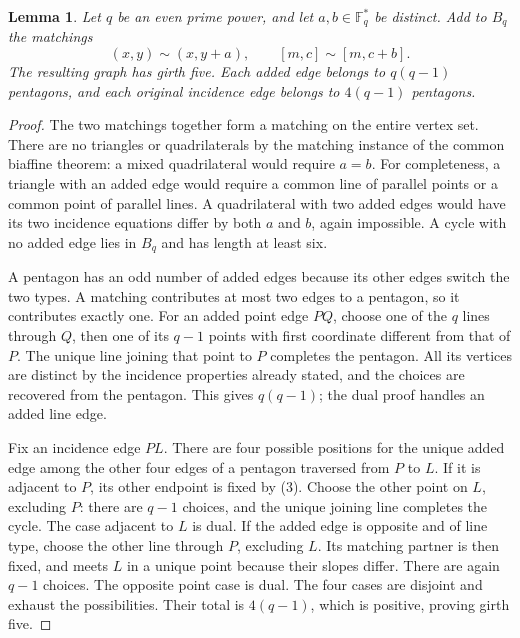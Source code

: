 \documentclass[11pt,a4paper]{article}
\newtheorem{lemma}[theorem]{Lemma}
\newcommand{\F}{\mathbb F}
\begin{document}
\begin{lemma}\label{matchingcount}
Let $q$ be an even prime power, and let $a,b\in\F_q^*$ be distinct.
Add to $B_q$ the matchings
\[
 (x,y)\sim(x,y+a),\qquad [m,c]\sim[m,c+b].
 \tag{3}
\]
The resulting graph has girth five. Each added edge belongs to
$q(q-1)$ pentagons, and each original incidence edge belongs to
$4(q-1)$ pentagons.
\end{lemma}
\begin{proof}
The two matchings together form a matching on the entire vertex set.
There are no triangles or quadrilaterals by the matching instance of
the common biaffine theorem: a mixed quadrilateral would require $a=b$.
For completeness, a triangle with an added edge would require a common
line of parallel points or a common point of parallel lines. A
quadrilateral with two added edges would have its two incidence
equations differ by both $a$ and $b$, again impossible. A cycle with
no added edge lies in $B_q$ and has length at least six.

A pentagon has an odd number of added edges because its other edges
switch the two types. A matching contributes at most two edges to a
pentagon, so it contributes exactly one. For an added point edge $PQ$,
choose one of the $q$ lines through $Q$, then one of its $q-1$ points
with first coordinate different from that of $P$. The unique line
joining that point to $P$ completes the pentagon. All its vertices are
distinct by the incidence properties already stated, and the choices
are recovered from the pentagon. This gives $q(q-1)$; the dual proof
handles an added line edge.

Fix an incidence edge $PL$. There are four possible positions for the
unique added edge among the other four edges of a pentagon traversed
from $P$ to $L$. If it is adjacent to $P$, its other endpoint is fixed
by (3). Choose the other point on $L$, excluding $P$: there are $q-1$
choices, and the unique joining line completes the cycle. The case
adjacent to $L$ is dual. If the added edge is opposite and of line
type, choose the other line through $P$, excluding $L$. Its matching
partner is then fixed, and meets $L$ in a unique point because their
slopes differ. There are again $q-1$ choices. The opposite point case
is dual. The four cases are disjoint and exhaust the possibilities.
Their total is $4(q-1)$, which is positive, proving girth five.
\end{proof}
\end{document}
